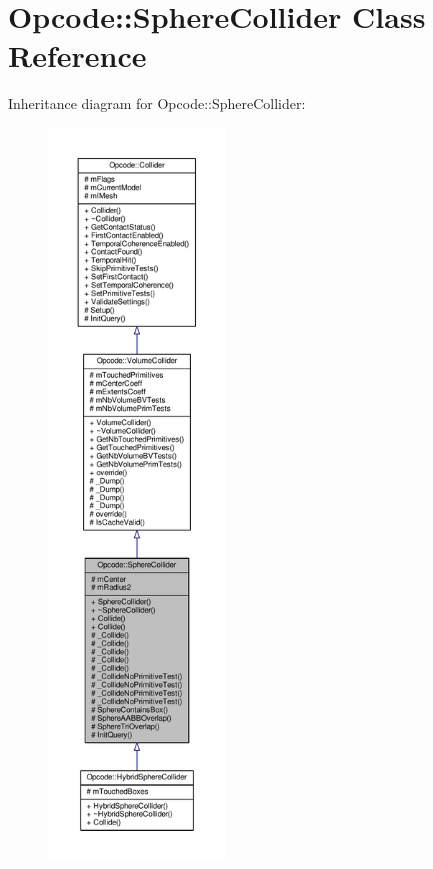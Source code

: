 \hypertarget{classOpcode_1_1SphereCollider}{}\section{Opcode\+:\+:Sphere\+Collider Class Reference}
\label{classOpcode_1_1SphereCollider}


Inheritance diagram for Opcode\+:\+:Sphere\+Collider\+:
\nopagebreak
\begin{figure}[H]
\begin{center}
\leavevmode
\includegraphics[height=550pt]{d4/df0/classOpcode_1_1SphereCollider__inherit__graph}
\end{center}
\end{figure}


